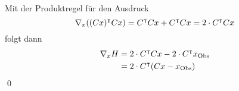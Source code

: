 Mit der Produktregel für den Ausdruck
\[
 \nabla_x ((Cx)^\intercal Cx) = C^\intercal Cx + C^\intercal Cx = 2\cdot C^\intercal Cx 
 \]
folgt dann 
\[
\begin{aligned}
 \nabla_x H &= 2\cdot C^\intercal Cx -2\cdot C^\intercal x_{\text{Obs}}\\
	    &= 2\cdot C^\intercal (Cx - x_{\text{Obs}})
\end{aligned}
\]
\qed

% 
